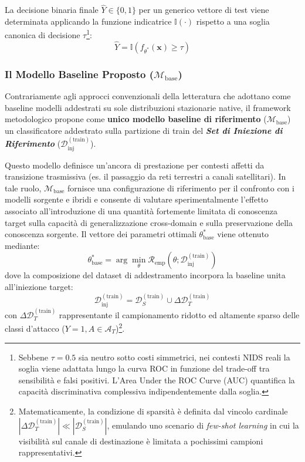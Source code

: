 La decisione binaria finale $\hat{Y} \in \{0, 1\}$ per un generico vettore di test viene determinata applicando la funzione indicatrice $\mathbb{I}(\cdot)$ rispetto a una soglia canonica di decisione $\tau$\footnote{Sebbene $\tau = 0.5$ sia neutro sotto costi simmetrici, nei contesti NIDS reali la soglia viene adattata lungo la curva ROC in funzione del trade-off tra sensibilità e falsi positivi. L'Area Under the ROC Curve (AUC) quantifica la capacità discriminativa complessiva indipendentemente dalla soglia.}: 
\begin{equation}
    \hat{Y} = \mathbb{I}\left(f_{\theta^*}(\mathbf{x}) \ge \tau\right)
    \label{eq:binary_decision}
\end{equation}

\subsubsection{Il Modello Baseline Proposto ($\mathcal{M}_{\text{base}}$)}
\label{subsubsec:modello_baseline}
Contrariamente agli approcci convenzionali della letteratura che adottano come baseline modelli addestrati su sole distribuzioni stazionarie native, il framework metodologico propone come \textbf{unico modello baseline di riferimento} ($\mathcal{M}_{\text{base}}$) un classificatore addestrato sulla partizione di train del \textbf{\textit{Set di Iniezione di Riferimento}} ($\mathcal{D}_{\text{inj}}^{(\text{train})}$).

Questo modello definisce un'ancora di prestazione per contesti affetti da transizione trasmissiva (es. il passaggio da reti terrestri a canali satellitari). 
In tale ruolo, $\mathcal{M}_{\text{base}}$ fornisce una configurazione di riferimento per il confronto con i modelli sorgente e ibridi e consente di valutare sperimentalmente l'effetto associato all'introduzione di una quantità fortemente limitata di conoscenza target sulla capacità di generalizzazione cross-domain e sulla preservazione della conoscenza sorgente. 
Il vettore dei parametri ottimali $\theta_{\text{base}}^*$ viene ottenuto mediante:
\begin{equation}
    \theta_{\text{base}}^* = \arg\min_\theta \mathcal{R}_{\text{emp}}\left(\theta; \mathcal{D}_{\text{inj}}^{(\text{train})}\right)
    \label{eq:mbase_optimization}
\end{equation}
dove la composizione del dataset di addestramento incorpora la baseline unita all'iniezione target:
\begin{equation}
    \mathcal{D}_{\text{inj}}^{(\text{train})} = \mathcal{D}_{S}^{(\text{train})} \cup \Delta \mathcal{D}_{T}^{(\text{train})}
    \label{eq:dinj_composition}
\end{equation}
con $\Delta \mathcal{D}_{T}^{(\text{train})}$ rappresentante il campionamento ridotto ed altamente sparso delle classi d'attacco ($Y=1, A \in \mathcal{A}_T$)\footnote{Matematicamente, la condizione di sparsità è definita dal vincolo cardinale $|\Delta \mathcal{D}_{T}^{(\text{train})}| \ll |\mathcal{D}_{S}^{(\text{train})}|$, emulando uno scenario di \textit{few-shot learning} in cui la visibilità sul canale di destinazione è limitata a pochissimi campioni rappresentativi.}.

